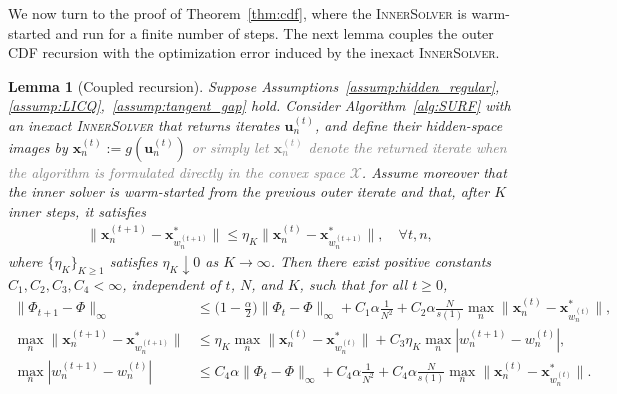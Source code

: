 \documentclass{article}
\newtheorem{lemma}{Lemma}
\newcommand{\bx}{\mathbf{x}}
\newcommand{\bu}{\mathbf{u}}
\newcommand{\X}{\mathcal{X}}
\newcommand{\Farc}{\Phi}
\begin{document}
We now turn to the proof of Theorem~\ref{thm:cdf}, where the \textsc{InnerSolver} is warm-started and run for a finite number of steps. The next lemma couples the outer CDF recursion with the optimization error induced by the inexact \textsc{InnerSolver}.
\begin{lemma}[Coupled recursion]
\label{lem:coupled_outer_inner_recursion}
Suppose Assumptions~\ref{assump:hidden_regular}, \ref{assump:LICQ},~\ref{assump:tangent_gap} hold.
Consider Algorithm~\ref{alg:SURF} with an inexact \textsc{InnerSolver} that returns iterates $\bu_n^{(t)}$, and define their hidden-space images by
$\bx_n^{(t)}:=g(\bu_n^{(t)})$ \textcolor{gray}{or simply let $\bx_n^{(t)}$ denote the returned
iterate when the algorithm is formulated directly in the convex space $\X$}.
Assume moreover that the inner solver is warm-started from the previous outer iterate and that, after $K$ inner steps, it satisfies
\begin{align}
\|\bx_n^{(t+1)}-\bx_{w_n^{(t+1)}}^*\| \le \eta_K \|\bx_n^{(t)}-\bx_{w_n^{(t+1)}}^*\|, \quad \forall t,n,
\label{eq:abstract_inner_rate_rhoK}
\end{align}
where $\{\eta_K\}_{K\ge1}$ satisfies $\eta_K\downarrow 0$ as $K\to\infty$.
Then there exist positive constants $C_1,C_2,C_3,C_4<\infty$, independent of $t$, $N$, and $K$, such that for all $t\ge0$,
\begin{align}
\|\Farc_{t+1}-\Farc\|_\infty
&\le \bigl(1-\tfrac{\alpha}{2}\bigr)\|\Farc_t-\Farc\|_\infty + C_1\alpha\frac{1}{N^2} + C_2\alpha\frac{N}{s(1)}\max_n\|\bx_n^{(t)}-\bx_{w_n^{(t)}}^*\|,
\label{eq:outer_recursion_rhoK}
\\
\max_n\|\bx_n^{(t+1)}-\bx_{w_n^{(t+1)}}^*\|
&\le \eta_K\max_n\|\bx_n^{(t)}-\bx_{w_n^{(t)}}^*\| + C_3\eta_K\max_n|w_n^{(t+1)}-w_n^{(t)}|,
\label{eq:inner_tracking_recursion_rhoK}
\\
\max_n|w_n^{(t+1)}-w_n^{(t)}|
&\le C_4\alpha\|\Farc_t-\Farc\|_\infty + C_4\alpha\frac{1}{N^2} + C_4\alpha\frac{N}{s(1)}\max_n\|\bx_n^{(t)}-\bx_{w_n^{(t)}}^*\|.
\label{eq:grid_motion_bound_rhoK}
\end{align}
\end{lemma}
\end{document}
